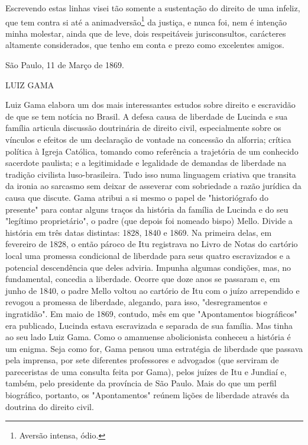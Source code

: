 Escrevendo estas linhas visei tão somente a sustentação do direito de
uma infeliz, que tem contra si até a animadversão\footnote{Aversão
  intensa, ódio.} da
justiça, e nunca foi, nem é intenção minha molestar, ainda que de leve,
dois respeitáveis jurisconsultos, carácteres altamente considerados, que
tenho em conta e prezo como excelentes amigos.

São Paulo, 11 de Março de 1869.

LUIZ GAMA


\pagebreak
\mbox{}\vfill
\thispagestyle{empty}

{\small\noindent
Luiz Gama elabora um dos mais interessantes estudos sobre direito
e escravidão de que se tem notícia no Brasil. A defesa causa de
liberdade de Lucinda e sua família articula discussão doutrinária de
direito civil, especialmente sobre os vínculos e efeitos de um
declaração de vontade na concessão da alforria; crítica política à
Igreja Católica, tomando como referência a trajetória de um conhecido
sacerdote paulista; e a legitimidade e legalidade de demandas de
liberdade na tradição civilista luso-brasileira. Tudo isso numa
linguagem criativa que transita da ironia ao sarcasmo sem deixar de
asseverar com sobriedade a razão jurídica da causa que discute. Gama
atribui a si mesmo o papel de "historiógrafo do presente" para contar
alguns traços da história da família de Lucinda e do seu "legítimo
proprietário", o padre (que depois foi nomeado bispo) Mello. Divide a
história em três datas distintas: 1828, 1840 e 1869. Na primeira delas,
em fevereiro de 1828, o então pároco de Itu registrava no Livro de Notas
do cartório local uma promessa condicional de liberdade para seus quatro
escravizados e a potencial descendência que deles adviria. Impunha
algumas condições, mas, no fundamental, concedia a liberdade. Ocorre que
doze anos se passaram e, em junho de 1840, o padre Mello voltou ao
cartório de Itu com o juízo arrependido e revogou a promessa de
liberdade, alegando, para isso, "desregramentos e ingratidão". Em maio
de 1869, contudo, mês em que "Apontamentos biográficos" era publicado,
Lucinda estava escravizada e separada de sua família. Mas tinha ao seu
lado Luiz Gama. Como o amanuense abolicionista conheceu a história é um
enigma. Seja como for, Gama pensou uma estratégia de liberdade que
passava pela imprensa, por sete diferentes professores e advogados (que
serviram de pareceristas de uma consulta feita por Gama), pelos juízes
de Itu e Jundiaí e, também, pelo presidente da província de São Paulo.
Mais do que um perfil biográfico, portanto, os "Apontamentos" reúnem
lições de liberdade através da doutrina do direito civil. }

